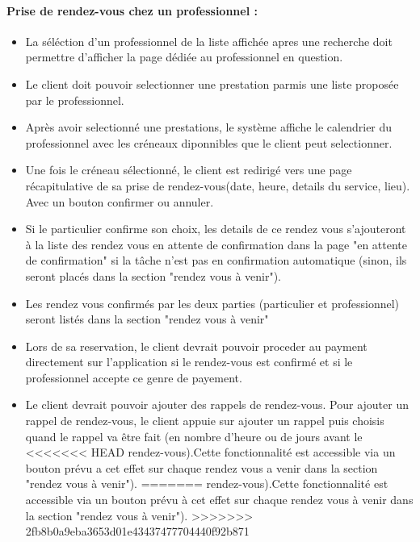 \documentclass{article}
\begin{document}
\paragraph{Prise de rendez-vous chez un professionnel :}
\begin{itemize}

\item La séléction d'un
  professionnel de la liste affichée apres une recherche doit permettre d'afficher la
  page dédiée au professionnel en question.
\item Le client doit pouvoir selectionner une prestation parmis une liste
  proposée par le professionnel.
\item Après avoir selectionné une prestations, le système affiche le
  calendrier du professionnel avec les créneaux diponnibles que le
  client peut selectionner.
\item Une fois le créneau sélectionné, le client est redirigé vers
    une page récapitulative de sa prise de rendez-vous(date, heure, details du service, lieu). Avec un bouton
    confirmer ou annuler.
\item Si le particulier confirme son choix, les details de ce rendez vous s'ajouteront à la liste des rendez
vous en attente de confirmation dans la page "en attente de confirmation"
si la tâche n'est pas en confirmation automatique (sinon, ils seront placés dans la section "rendez vous à venir").
\item Les rendez vous confirmés par les deux parties (particulier et professionnel) seront listés dans la section "rendez vous à venir"
\item Lors de sa reservation, le client devrait pouvoir proceder au
  payment directement sur l'application si le rendez-vous est confirmé et si le professionnel accepte ce genre de payement.
\item Le client devrait pouvoir ajouter des
  rappels de rendez-vous. Pour ajouter un rappel de rendez-vous, le
  client appuie sur \og ajouter un rappel \fg{} puis choisis quand le
  rappel va être fait (en nombre d'heure ou de jours avant le
<<<<<<< HEAD
  rendez-vous).Cette fonctionnalité est accessible via un bouton
  prévu a cet effet sur chaque rendez vous a venir dans la section "rendez vous à venir").
=======
  rendez-vous).Cette fonctionnalité est accessible via un bouton 
  prévu à cet effet sur chaque rendez vous à venir dans la section "rendez vous à venir").
>>>>>>> 2fb8b0a9eba3653d01e43437477704440f92b871



\end{itemize}
\end{document}

